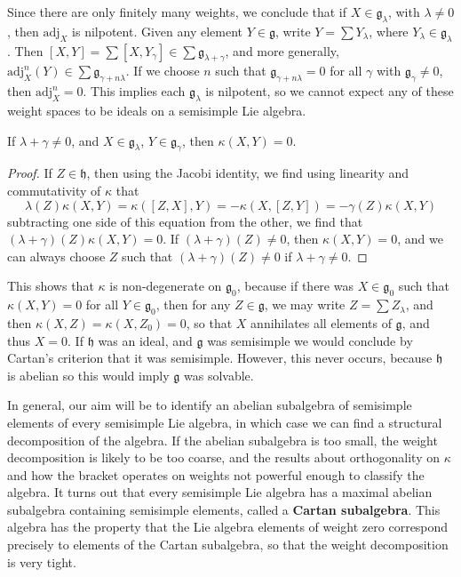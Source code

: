 Since there are only finitely many weights, we conclude that if $X \in \mathfrak{g}_\lambda$, with $\lambda \neq 0$, then $\text{adj}_X$ is nilpotent. Given any element $Y \in \mathfrak{g}$, write $Y = \sum Y_\lambda$, where $Y_\lambda \in \mathfrak{g}_\lambda$. Then $[X,Y] = \sum [X,Y_\gamma] \in \sum \mathfrak{g}_{\lambda + \gamma}$, and more generally, $\text{adj}_X^n(Y) \in \sum \mathfrak{g}_{\gamma + n \lambda}$. If we choose $n$ such that $\mathfrak{g}_{\gamma + n \lambda} = 0$ for all $\gamma$ with $\mathfrak{g}_\gamma \neq 0$, then $\text{adj}^n_X = 0$. This implies each $\mathfrak{g}_\lambda$ is nilpotent, so we cannot expect any of these weight spaces to be ideals on a semisimple Lie algebra.

\begin{theorem}
    If $\lambda + \gamma \neq 0$, and $X \in \mathfrak{g}_\lambda$, $Y \in \mathfrak{g}_\gamma$, then $\kappa(X,Y) = 0$.
\end{theorem}
\begin{proof}
    If $Z \in \mathfrak{h}$, then using the Jacobi identity, we find using linearity and commutativity of $\kappa$ that
    \[ \lambda(Z) \kappa(X,Y) = \kappa([Z,X],Y) = -\kappa(X,[Z,Y]) = - \gamma(Z) \kappa(X,Y) \]
    subtracting one side of this equation from the other, we find that $(\lambda + \gamma)(Z) \kappa(X,Y) = 0$. If $(\lambda + \gamma)(Z) \neq 0$, then $\kappa(X,Y) = 0$, and we can always choose $Z$ such that $(\lambda + \gamma)(Z) \neq 0$ if $\lambda + \gamma \neq 0$.
\end{proof}

This shows that $\kappa$ is non-degenerate on $\mathfrak{g}_0$, because if there was $X \in \mathfrak{g}_0$ such that $\kappa(X,Y) = 0$ for all $Y \in \mathfrak{g}_0$, then for any $Z \in \mathfrak{g}$, we may write $Z = \sum Z_\lambda$, and then $\kappa(X,Z) = \kappa(X,Z_0) = 0$, so that $X$ annihilates all elements of $\mathfrak{g}$, and thus $X = 0$. If $\mathfrak{h}$ was an ideal, and $\mathfrak{g}$ was semisimple we would conclude by Cartan's criterion that it was semisimple. However, this never occurs, because $\mathfrak{h}$ is abelian so this would imply $\mathfrak{g}$ was solvable.

In general, our aim will be to identify an abelian subalgebra of semisimple elements of every semisimple Lie algebra, in which case we can find a structural decomposition of the algebra. If the abelian subalgebra is too small, the weight decomposition is likely to be too coarse, and the results about orthogonality on $\kappa$ and how the bracket operates on weights not powerful enough to classify the algebra. It turns out that every semisimple Lie algebra has a maximal abelian subalgebra containing semisimple elements, called a {\bf Cartan subalgebra}. This algebra has the property that the Lie algebra elements of weight zero correspond precisely to elements of the Cartan subalgebra, so that the weight decomposition is very tight.

